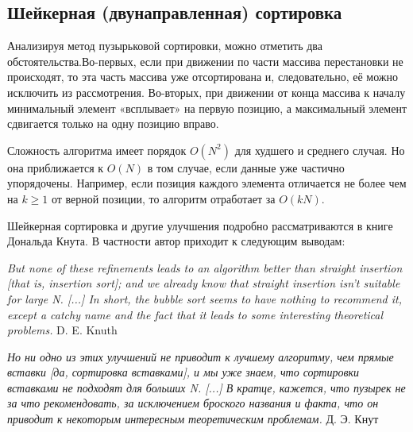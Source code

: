 \subsection{Шейкерная (двунаправленная) сортировка}
Анализируя метод пузырьковой сортировки, можно отметить два обстоятельства.Во-первых, если при 
движении по части массива перестановки не происходят, то эта часть массива уже отсортирована и, 
следовательно, её можно исключить из рассмотрения. Во-вторых, при движении от конца массива 
к началу минимальный элемент «всплывает» на первую позицию, а максимальный элемент сдвигается 
только на одну позицию вправо\cite{cocktailsort:wiki}.\par
Сложность алгоритма имеет порядок $O(N^2)$ для худшего и среднего случая. Но она приближается
к $O(N)$ в том случае, если данные уже частично упорядочены. Например, если позиция каждого элемента
отличается не более чем на $k \geqslant 1$ от верной позиции, то алгоритм отработает за $O(kN)$. \par
Шейкерная сортировка и другие улучшения подробно рассматриваются в книге  Дональда Кнута. 
В частности автор приходит к следующим выводам:
\begin{displayquote}
\textit{
  But none of these refinements leads to an algorithm better than straight insertion [that is, 
  insertion sort]; and we already know that straight insertion isn't suitable for large N. 
  [...] In short, the bubble sort seems to have nothing to recommend it, except a catchy name 
  and the fact that it leads to some interesting theoretical problems.
}\break
\hfill D. E. Knuth
\end{displayquote}
\begin{displayquote}
\textit{
    Но ни одно из этих улучшений не приводит к лучшему алгоритму, чем прямые вставки [да, сортировка вставками], 
    и мы уже знаем, что сортировки вставками не подходят для больших N. [...] В кратце, кажется, что
    пузырек не за что рекомендовать, за исключением броского названия и факта, что он приводит к некоторым
    интересным теоретическим проблемам.
}\break
\hfill Д. Э. Кнут
\end{displayquote}

